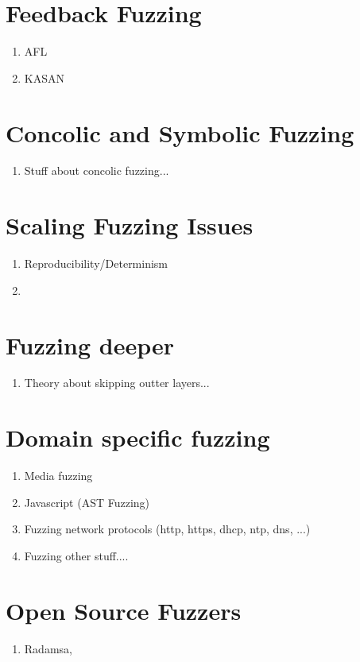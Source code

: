 \documentclass[12pt]{Training}
\begin{document}
\section*{Feedback Fuzzing}
\begin{enumerate}
	\item AFL
	\item KASAN
\end{enumerate}

\section*{Concolic and Symbolic Fuzzing}
\begin{enumerate}
    \item Stuff about concolic fuzzing...
\end{enumerate}

\section*{Scaling Fuzzing Issues}
\begin{enumerate}
	\item Reproducibility/Determinism
	\item 
\end{enumerate}

\section*{Fuzzing deeper}
\begin{enumerate}
    \item Theory about skipping outter layers...
\end{enumerate}

\section*{Domain specific fuzzing}
\begin{enumerate}
    \item Media fuzzing
    \item Javascript (AST Fuzzing)
    \item Fuzzing network protocols (http, https, dhcp, ntp, dns, ...)
    \item Fuzzing other stuff....
\end{enumerate}

\section*{Open Source Fuzzers}
\begin{enumerate}
    \item Radamsa, 
\end{enumerate}
\end{document}
